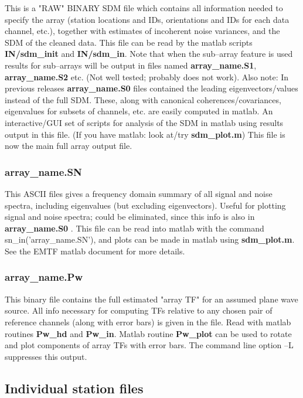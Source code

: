 This is a "RAW" BINARY SDM file which contains all
information needed to specify the array (station locations and IDs,
orientations and IDs for each data channel, etc.), together with
estimates of incoherent noise variances, and the SDM of the cleaned data.
This file can be read by the matlab scripts {\bf IN/sdm\_init}
and {\bf IN/sdm\_in}.
Note that when the sub--array feature is used results for sub--arrays will
be output in files named {\bf array\_name.S1}, {\bf array\_name.S2}
etc. (Not well tested; probably does not work).
Also note:  In previous releases {\bf array\_name.S0} files contained the leading
eigenvectors/values instead of the full SDM.  These, along with
canonical coherences/covariances, eigenvalues for subsets of channels,
etc. are easily computed in matlab.  An interactive/GUI set of scripts
for analysis of the SDM in matlab using results
output in this file.  (If you have matlab: look at/try {\bf sdm\_plot.m})
This file is now the main full array output file.

\subsubsection{array\_name.SN}

This ASCII files gives a frequency domain summary of
all signal and noise spectra, including eigenvalues (but excluding
eigenvectors).   Useful for plotting signal and noise spectra; could
be eliminated, since this info is also in {\bf array\_name.S0 }.  This file
can be read into matlab with the command sn\_in('array\_name.SN'),
and plots can be made in matlab using {\bf sdm\_plot.m}.  See the EMTF matlab document
for more details.

\subsubsection{array\_name.Pw}

This binary file contains the full estimated "array TF" for
an assumed plane wave source.  All info necessary for computing TFs 
relative to any chosen pair of reference channels (along with error bars)
is given in the file.  Read with matlab routines {\bf Pw\_hd} and {\bf Pw\_in}.
Matlab routine {\bf Pw\_plot} can be used to rotate and plot components of
array TFs with error bars.
The command line option --L suppresses this output.

\subsection{Individual station files}

